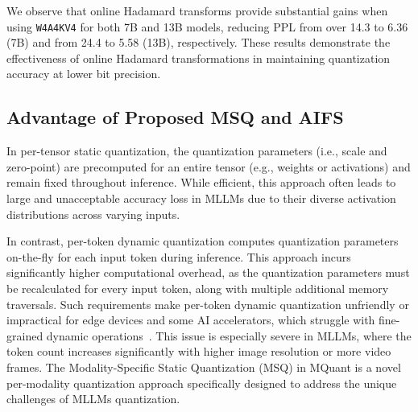 \begin{table}[h]
\caption{Comparison of perplexity (PPL) with or without online Hadamard transforms in Quarot, evaluated on LLaMA2 models of sizes 7B and 13B. Lower PPL is better.}
\label{table:online-hadda}
\centering
{}
\vspace{-4mm}
\end{table}

We observe that online Hadamard transforms provide substantial gains when using \texttt{W4A4KV4} for both 7B and 13B models, reducing PPL from over 14.3 to 6.36 (7B) and from 24.4 to 5.58 (13B), respectively. These results demonstrate the effectiveness of online Hadamard transformations in maintaining quantization accuracy at lower bit precision.

\subsection{Advantage of Proposed MSQ and AIFS}
\label{aifs_msq_pros}
In per-tensor static quantization, the quantization parameters (i.e., scale and zero-point) are precomputed for an entire tensor (e.g., weights or activations) and remain fixed throughout inference. While efficient, this approach often leads to large and unacceptable accuracy loss in MLLMs due to their diverse activation distributions across varying inputs.

In contrast, per-token dynamic quantization computes quantization parameters on-the-fly for each input token during inference. This approach incurs significantly higher computational overhead, as the quantization parameters must be recalculated for every input token, along with multiple additional memory traversals. Such requirements make per-token dynamic quantization unfriendly or impractical for edge devices and some AI accelerators, which struggle with fine-grained dynamic operations~\cite{2024_mobilequant}. This issue is especially severe in MLLMs, where the token count increases significantly with higher image resolution or more video frames. The Modality-Specific Static Quantization (MSQ) in MQuant is a novel per-modality quantization approach specifically designed to address the unique challenges of MLLMs quantization.

